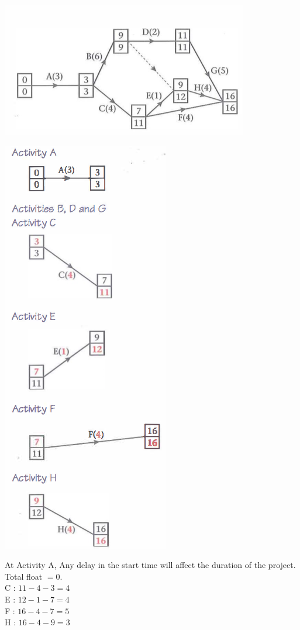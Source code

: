 \documentclass[a4paper]{article}
\begin{document}
\begin{eg}
	\begin{center}
		\includegraphics[scale=0.5]{img_D/5_10}
	\end{center}
	\begin{center}
		\includegraphics[scale=0.5]{img_D/5_10_1}
	\end{center}
	At Activity A, Any delay in the start time will affect the duration of the project. Total float $= 0$.\\
	C :  $11-4-3=4$\\
	E :  $12-1-7=4$\\
	F : $16-4-7=5$\\
	H :  $16-4-9=3$\\
\end{eg}
\end{document}
